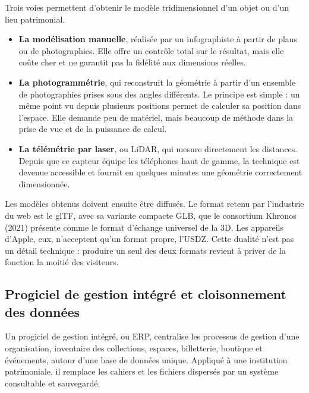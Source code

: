 Trois voies permettent d'obtenir le modèle tridimensionnel d'un objet ou d'un
lieu patrimonial.

\begin{itemize}
  \item \textbf{La modélisation manuelle}, réalisée par un infographiste à
        partir de plans ou de photographies. Elle offre un contrôle total sur le
        résultat, mais elle coûte cher et ne garantit pas la fidélité aux
        dimensions réelles.
  \item \textbf{La photogrammétrie}, qui reconstruit la géométrie à partir d'un
        ensemble de photographies prises sous des angles différents. Le principe
        est simple : un même point vu depuis plusieurs positions permet de
        calculer sa position dans l'espace. Elle demande peu de matériel, mais
        beaucoup de méthode dans la prise de vue et de la puissance de calcul.
  \item \textbf{La télémétrie par laser}, ou LiDAR, qui mesure directement les
        distances. Depuis que ce capteur équipe les téléphones haut de gamme,
        la technique est devenue accessible et fournit en quelques minutes une
        géométrie correctement dimensionnée.
\end{itemize}

Les modèles obtenus doivent ensuite être diffusés. Le format retenu par
l'industrie du web est le glTF, avec sa variante compacte GLB, que le consortium
Khronos (2021) présente comme le format d'échange universel de la 3D. Les
appareils d'Apple, eux, n'acceptent qu'un format propre, l'USDZ. Cette dualité
n'est pas un détail technique : produire un seul des deux formats revient à
priver de la fonction la moitié des visiteurs.

\subsection{Progiciel de gestion intégré et cloisonnement des données}

Un progiciel de gestion intégré, ou ERP, centralise les processus de gestion
d'une organisation, inventaire des collections, espaces, billetterie, boutique
et événements, autour d'une base de données unique. Appliqué à une institution
patrimoniale, il remplace les cahiers et les fichiers dispersés par un système
consultable et sauvegardé.

